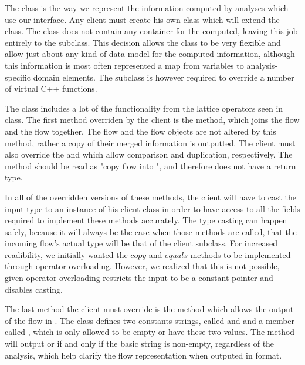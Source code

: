 The  class is the way we represent the information computed by analyses which use our interface. Any client must create his own class which will extend the  class. The class does not contain any container for the computed, leaving this job entirely to the subclass. This decision allows the class to be very flexible and allow just about any kind of data model for the computed information, although this information is most often represented a map from variables to analysis-specific domain elements. The subclass is however required to override a number of virtual C++ functions.

The  class includes a lot of the functionality from the lattice operators seen in class. The first method overriden by the client is the  method, which joins the  flow and the  flow together. The  flow and the  flow objects are not altered by this method, rather a copy of their merged information is outputted. The client must also override the  and  which allow comparison and duplication, respectively. The  method should be read as "copy flow  into ", and therefore does not have a return type.

In all of the overridden versions of these methods, the client will have to cast the input  type to an instance of his client class in order to have access to all the fields required to implement these methods accurately. The type casting can happen safely, because it will always be the case when those methods are called, that the incoming flow's actual type will be that of the client subclass. For increased readibility, we initially wanted the $copy$ and $equals$ methods to be implemented through operator overloading. However, we realized that this is not possible, given operator overloading restricts the input to be a constant pointer and disables casting.

The last method the client must override is the  method which allows the output of the flow in . The class defines two constants strings, called  and  and a member called , which is only allowed to be empty or have these two values. The  method will output  or  if and only if the basic string is non-empty, regardless of the analysis, which help clarify the flow representation when outputed in  format.

